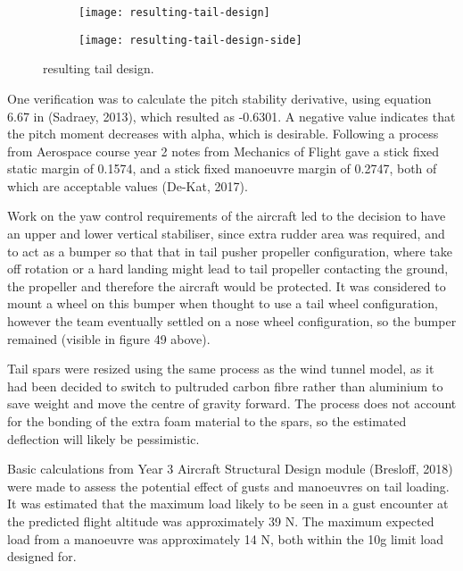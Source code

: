 \documentclass[../../main.tex]{subfiles}
\begin{document}
\begin{figure}[H]

    \centering
    \begin{subfigure}[b]{0.49\columnwidth}
        \centering
        \texttt{[image: resulting-tail-design]}
        \caption{}
        \label{fig:final-tail-design:angle}
    \end{subfigure}
    \hfill
    \begin{subfigure}[b]{0.49\columnwidth}
        \centering
        \texttt{[image: resulting-tail-design-side]}
        \caption{}
        \label{fig:final-tail-design:side}
    \end{subfigure}
    
    \caption{resulting tail design.}
    \label{fig:final-tail-design}
\end{figure} 

One verification was to calculate the pitch stability derivative, using equation 6.67 in (Sadraey, 2013), which resulted as -0.6301.
A negative value indicates that the pitch moment decreases with alpha, which is desirable.
Following a process from Aerospace course year 2 notes from Mechanics of Flight gave a stick fixed static margin of 0.1574, and a stick fixed manoeuvre margin of 0.2747, both of which are acceptable values (De-Kat, 2017). 

Work on the yaw control requirements of the aircraft led to the decision to have an upper and lower vertical stabiliser, since extra rudder area was required, and to act as a bumper so that that in tail pusher propeller configuration, where take off rotation or a hard landing might lead to tail propeller contacting the ground, the propeller and therefore the aircraft would be protected.
It was considered to mount a wheel on this bumper when thought to use a tail wheel configuration, however the team eventually settled on a nose wheel configuration, so the bumper remained (visible in figure 49 above). 

Tail spars were resized using the same process as the wind tunnel model, as it had been decided to switch to pultruded carbon fibre rather than aluminium to save weight and move the centre of gravity forward.
The process does not account for the bonding of the extra foam material to the spars, so the estimated deflection will likely be pessimistic.  

Basic calculations from Year 3 Aircraft Structural Design module (Bresloff, 2018) were made to assess the potential effect of gusts and manoeuvres on tail loading.
It was estimated that the maximum load likely to be seen in a gust encounter at the predicted flight altitude was approximately 39 N.
The maximum expected load from a manoeuvre was approximately 14 N, both within the 10g limit load designed for. 
\end{document}
